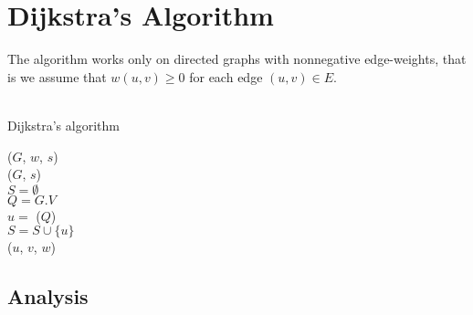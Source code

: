 \section{Dijkstra's Algorithm}
The algorithm works only on directed graphs with nonnegative edge-weights,
that is we assume that $w(u, v) \geq 0$ for each edge $(u, v) \in E$.
\\\\
\begin{algorithm}[H]
	\caption{Dijkstra's algorithm}
	\label{alg:dijkstra}
	
	
	
	
	\BlankLine
	\Dijkstra($G$, $w$, $s$) \\
	\Begin
	{
		\InitSingleSource($G$, $s$) \\
		$S = \emptyset$ \\
		$Q = G.V$ \\
		{
			$u = $ \ExtractMin($Q$) \\
			$S = S \cup \{u\}$ \\
			{
				\Relax($u$, $v$, $w$)
			}
		}
	}
\end{algorithm}

\subsection{Analysis}
%

\newpage

